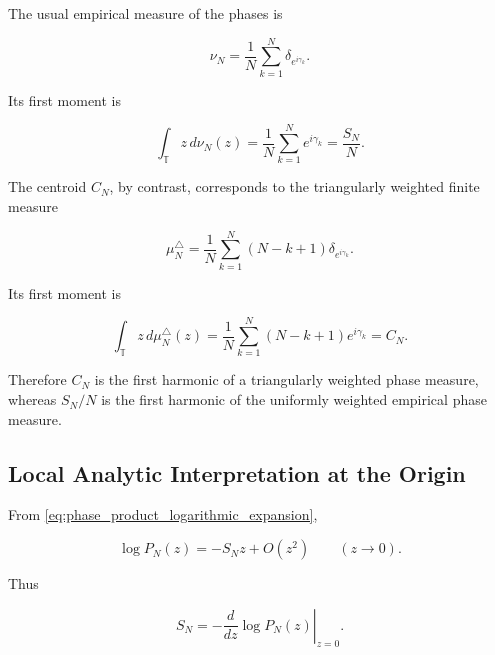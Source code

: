 \documentclass[11pt]{amsart}
\numberwithin{equation}{section}
\theoremstyle{plain}
\theoremstyle{definition}
\theoremstyle{remark}
\begin{document}
The usual empirical measure of the phases is

\begin{equation}
\nu_N
=
\frac{1}{N}
\sum_{k=1}^{N}
\delta_{e^{i\gamma_k}}.
\label{eq:uniform_empirical_phase_measure}
\end{equation}

Its first moment is

\begin{equation}
\int_{\mathbb T}
z\,d\nu_N(z)
=
\frac{1}{N}
\sum_{k=1}^{N}
e^{i\gamma_k}
=
\frac{S_N}{N}.
\label{eq:uniform_empirical_phase_first_moment}
\end{equation}

The centroid \(C_N\), by contrast, corresponds to the triangularly
weighted finite measure

\begin{equation}
\mu_N^{\triangle}
=
\frac{1}{N}
\sum_{k=1}^{N}
(N-k+1)
\delta_{e^{i\gamma_k}}.
\label{eq:triangular_phase_measure}
\end{equation}

Its first moment is

\begin{equation}
\int_{\mathbb T}
z\,d\mu_N^{\triangle}(z)
=
\frac{1}{N}
\sum_{k=1}^{N}
(N-k+1)e^{i\gamma_k}
=
C_N.
\label{eq:triangular_phase_measure_first_moment}
\end{equation}

Therefore \(C_N\) is the first harmonic of a triangularly weighted phase
measure, whereas \(S_N/N\) is the first harmonic of the uniformly
weighted empirical phase measure.

\subsection{Local Analytic Interpretation at the Origin}
\label{subsec:local_analytic_interpretation_origin}

From \eqref{eq:phase_product_logarithmic_expansion},

\begin{equation}
\log P_N(z)
=
-
S_N z
+
O(z^2)
\qquad
(z\to 0).
\label{eq:phase_product_local_expansion}
\end{equation}

Thus

\begin{equation}
S_N
=
-
\left.
\frac{d}{dz}
\log P_N(z)
\right|_{z=0}.
\label{eq:SN_local_analytic_interpretation}
\end{equation}
\end{document}
